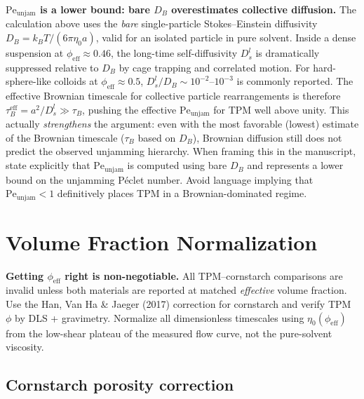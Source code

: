 \documentclass[11pt,letterpaper]{article}
\newcommand{\phieff}{\phi_{\mathrm{eff}}}
\newcommand{\taub}{\tau_{B}}
\newcommand{\peunj}{\mathrm{Pe}_{\mathrm{unjam}}}
\newcommand{\DB}{D_B}
\begin{document}
\begin{cautionbox}
\textbf{$\peunj$ is a lower bound: bare $\DB$ overestimates collective diffusion.}
The calculation above uses the \emph{bare} single-particle Stokes--Einstein diffusivity
$\DB = k_BT/(6\pi\eta_0 a)$, valid for an isolated particle in pure solvent. Inside a
dense suspension at $\phieff \approx 0.46$, the long-time self-diffusivity $D_s^l$ is
dramatically suppressed relative to $\DB$ by cage trapping and correlated motion. For
hard-sphere-like colloids at $\phieff \approx 0.5$, $D_s^l/\DB \sim 10^{-2}$--$10^{-3}$
is commonly reported. The effective Brownian timescale for collective particle rearrangements
is therefore $\tau_B^\mathrm{eff} = a^2/D_s^l \gg \taub$, pushing the effective $\peunj$ for
TPM well above unity. This actually \emph{strengthens} the argument: even with the most
favorable (lowest) estimate of the Brownian timescale ($\taub$ based on $\DB$), Brownian
diffusion still does not predict the observed unjamming hierarchy. When framing this in the
manuscript, state explicitly that $\peunj$ is computed using bare $\DB$ and represents a
lower bound on the unjamming P\'{e}clet number. Avoid language implying that $\peunj < 1$
definitively places TPM in a Brownian-dominated regime.
\end{cautionbox}

\section{Volume Fraction Normalization}

\begin{cautionbox}
\textbf{Getting $\phieff$ right is non-negotiable.} All TPM--cornstarch
comparisons are invalid unless both materials are reported at matched
\emph{effective} volume fraction. Use the Han, Van Ha \& Jaeger (2017)
correction \cite{HanVanHa2017} for cornstarch and verify TPM $\phi$ by
DLS + gravimetry. Normalize all dimensionless timescales using
$\eta_0(\phieff)$ from the low-shear plateau of the measured flow curve,
not the pure-solvent viscosity.
\end{cautionbox}

\subsection{Cornstarch porosity correction \cite{HanVanHa2017}}
\end{document}
